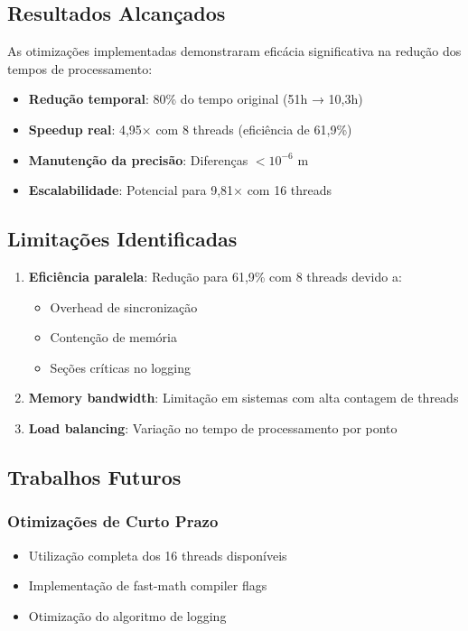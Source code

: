 \documentclass[12pt,a4paper]{article}
\begin{document}
\subsection{Resultados Alcançados}

As otimizações implementadas demonstraram eficácia significativa na redução dos tempos de processamento:

\begin{itemize}
    \item \textbf{Redução temporal}: 80\% do tempo original (51h → 10,3h)
    \item \textbf{Speedup real}: 4,95× com 8 threads (eficiência de 61,9\%)
    \item \textbf{Manutenção da precisão}: Diferenças $< 10^{-6}$ m
    \item \textbf{Escalabilidade}: Potencial para 9,81× com 16 threads
\end{itemize}

\subsection{Limitações Identificadas}

\begin{enumerate}
    \item \textbf{Eficiência paralela}: Redução para 61,9\% com 8 threads devido a:
        \begin{itemize}
            \item Overhead de sincronização
            \item Contenção de memória
            \item Seções críticas no logging
        \end{itemize}
    \item \textbf{Memory bandwidth}: Limitação em sistemas com alta contagem de threads
    \item \textbf{Load balancing}: Variação no tempo de processamento por ponto
\end{enumerate}

\subsection{Trabalhos Futuros}

\subsubsection{Otimizações de Curto Prazo}
\begin{itemize}
    \item Utilização completa dos 16 threads disponíveis
    \item Implementação de fast-math compiler flags
    \item Otimização do algoritmo de logging
\end{itemize}
\end{document}
